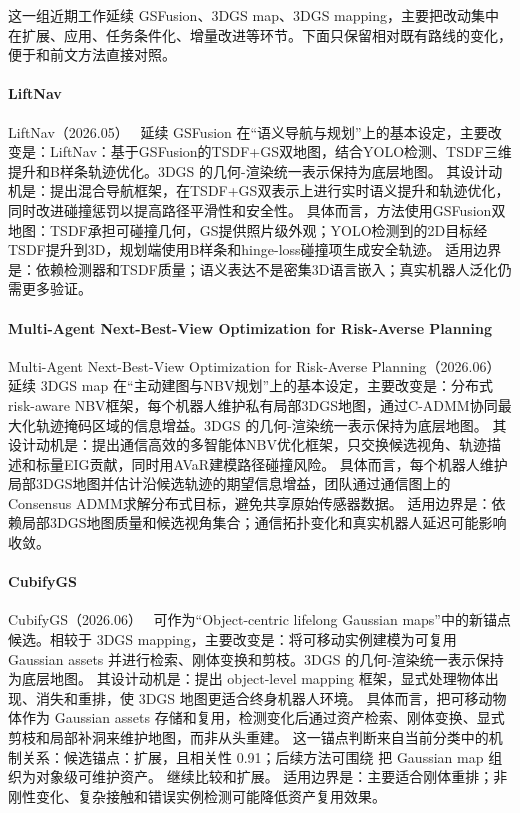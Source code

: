 这一组近期工作延续 GSFusion、3DGS map、3DGS mapping，主要把改动集中在扩展、应用、任务条件化、增量改进等环节。下面只保留相对既有路线的变化，便于和前文方法直接对照。

\paragraph{LiftNav}
LiftNav（2026.05）~\cite{2605_31376} 延续 GSFusion 在“语义导航与规划”上的基本设定，主要改变是：LiftNav：基于GSFusion的TSDF+GS双地图，结合YOLO检测、TSDF三维提升和B样条轨迹优化。3DGS 的几何-渲染统一表示保持为底层地图。
其设计动机是：提出混合导航框架，在TSDF+GS双表示上进行实时语义提升和轨迹优化，同时改进碰撞惩罚以提高路径平滑性和安全性。
具体而言，方法使用GSFusion双地图：TSDF承担可碰撞几何，GS提供照片级外观；YOLO检测到的2D目标经TSDF提升到3D，规划端使用B样条和hinge-loss碰撞项生成安全轨迹。
适用边界是：依赖检测器和TSDF质量；语义表达不是密集3D语言嵌入；真实机器人泛化仍需更多验证。

\paragraph{Multi-Agent Next-Best-View Optimization for Risk-Averse Planning}
Multi-Agent Next-Best-View Optimization for Risk-Averse Planning（2026.06）~\cite{2606_04158} 延续 3DGS map 在“主动建图与NBV规划”上的基本设定，主要改变是：分布式risk-aware NBV框架，每个机器人维护私有局部3DGS地图，通过C-ADMM协同最大化轨迹掩码区域的信息增益。3DGS 的几何-渲染统一表示保持为底层地图。
其设计动机是：提出通信高效的多智能体NBV优化框架，只交换候选视角、轨迹描述和标量EIG贡献，同时用AVaR建模路径碰撞风险。
具体而言，每个机器人维护局部3DGS地图并估计沿候选轨迹的期望信息增益，团队通过通信图上的Consensus ADMM求解分布式目标，避免共享原始传感器数据。
适用边界是：依赖局部3DGS地图质量和候选视角集合；通信拓扑变化和真实机器人延迟可能影响收敛。

\paragraph{CubifyGS}
CubifyGS（2026.06）~\cite{2606_28720} 可作为“Object-centric lifelong Gaussian maps”中的新锚点候选。相较于 3DGS mapping，主要改变是：将可移动实例建模为可复用 Gaussian assets 并进行检索、刚体变换和剪枝。3DGS 的几何-渲染统一表示保持为底层地图。
其设计动机是：提出 object-level mapping 框架，显式处理物体出现、消失和重排，使 3DGS 地图更适合终身机器人环境。
具体而言，把可移动物体作为 Gaussian assets 存储和复用，检测变化后通过资产检索、刚体变换、显式剪枝和局部补洞来维护地图，而非从头重建。
这一锚点判断来自当前分类中的机制关系：候选锚点：扩展，且相关性 0.91；后续方法可围绕 把 Gaussian map 组织为对象级可维护资产。 继续比较和扩展。
适用边界是：主要适合刚体重排；非刚性变化、复杂接触和错误实例检测可能降低资产复用效果。

